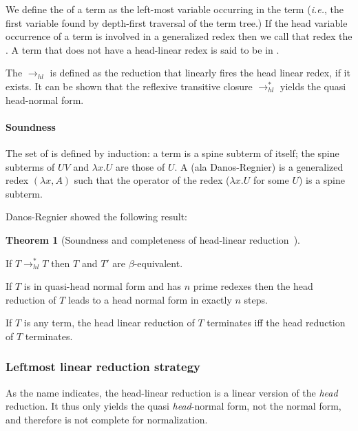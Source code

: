\documentclass{article}
\makeatletter
\theoremstyle{definition}
\newtheorem{theorem}{Theorem}[section]
\renewcommand\ie{{\it i.e.\@\xspace}}
\makeatother
\begin{document}
We define the  of a term as the left-most variable occurring in the term (\ie, the first variable found by depth-first traversal of the term tree.) If the head variable occurrence of a term is involved in a generalized redex then we call that redex the .
A term that does not have a head-linear redex is said to be in .

The  $\rightarrow_{hl}$ is defined as the reduction that linearly fires the head linear redex, if it exists. It can be shown that the reflexive transitive closure $\rightarrow^*_{hl}$ yields the quasi head-normal form.

\paragraph{Soundness}
The set of  is defined by induction: a term is a spine subterm of itself; the spine subterms of $U V$ and $\lambda x. U$ are those of $U$.
A  (ala Danos-Regnier) is a generalized redex $(\lambda x, A)$ such that the operator of the redex ($\lambda x . U$ for some $U$) is a spine subterm.

Danos-Regnier showed the following result:
\begin{theorem}[Soundness and completeness of head-linear reduction~\cite{danos-head}]
\label{thm:danosreigner_headlinred}
\begin{compactitem}
\item If $T \rightarrow^*_{hl} T$  then $T$ and $T'$ are $\beta$-equivalent.
\item If $T$ is in quasi-head normal form and has $n$ prime redexes then the head reduction of $T$ leads to a head normal form in exactly $n$ steps.
\item If $T$ is any term, the head linear reduction of $T$ terminates iff the head reduction of $T$ terminates.
\end{compactitem}
\end{theorem}

\subsubsection{Leftmost linear reduction strategy}

As the name indicates, the head-linear reduction is a linear version of the \emph{head} reduction. It thus only yields the quasi \emph{head}-normal form, not the normal form, and therefore is not complete for normalization.
\end{document}
